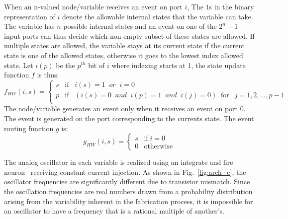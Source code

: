 \documentclass[10pt]{article}
\begin{document}
When an n-valued node/variable receives an event on port $i$, The $1$s in the binary representation of $i$ denote the allowable internal states that the variable can take. The variable has $n$ possible internal states and an event on one of the  $2^n-1$ input ports can thus decide which non-empty subset of these states are allowed. If multiple states are allowed, the variable stays at its current state if the current state is one of the allowed states, otherwise it goes to the lowest index allowed state. Let $i(p)$ be the $p^{th}$ bit of $i$ where indexing starts at 1, the state update function $f$ is thus:
\begin{equation}
  f_{HW}(i,s) =
  \begin{cases}
    s & \text{if}\;\;\; i(s)=1\;\; or \;\; i=0 \\
    p       & \text{if}\;\;\; (i(s)=0\;\; and\;\; i(p)=1\;\; and \;\; i(j)=0) \;\;\text{for}\;\;\ j=1,2,\ldots,p-1 \\
  \end{cases}
 \label{eq:hwstate}
\end{equation}
The node/variable generates an event only when it receives an event on port $0$. The event is generated on the port corresponding to the currents state. The event routing function $g$ is:
\begin{equation}
  g_{HW}(i,s) =
  \begin{cases}
    s & \text{if}\; i=0 \\
    0       & \text{otherwise} 
  \end{cases}
 \label{eq:hwroute}
\end{equation}

The analog oscillator in each variable is realized using an integrate and fire neuron~\cite{Indiveri_etal06} receiving constant current injection. As shown in Fig.~\ref{fig:arch_c}, the oscillator frequencies are significantly different due to transistor mismatch. Since the oscillation frequencies are real numbers drawn from a probability distribution arising from the variability inherent in the fabrication process, it is impossible for an oscillator to have a frequency that is a rational multiple of another's.
\end{document}
